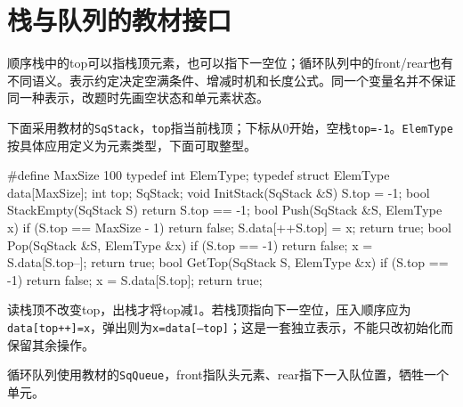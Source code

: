\section{栈与队列的教材接口}\label{DS03-code}

\begin{definition}

顺序栈中的top可以指栈顶元素，也可以指下一空位；循环队列中的front/rear也有不同语义。表示约定决定空满条件、增减时机和长度公式。同一个变量名并不保证同一种表示，改题时先画空状态和单元素状态。

\end{definition}

下面采用教材的\texttt{SqStack}，\texttt{top}指当前栈顶；下标从0开始，空栈\texttt{top=\allowbreak{}-1}。\texttt{ElemType}按具体应用定义为元素类型，下面可取整型。

\par\medskip\noindent\begin{minipage}{\linewidth}
\begin{codeblock}[language=C++]
#define MaxSize 100
typedef int ElemType;
typedef struct {
    ElemType data[MaxSize];
    int top;
} SqStack;
void InitStack(SqStack &S) { S.top = -1; }
bool StackEmpty(SqStack S) { return S.top == -1; }
bool Push(SqStack &S, ElemType x) {
    if (S.top == MaxSize - 1) return false;
    S.data[++S.top] = x;
    return true;
}
bool Pop(SqStack &S, ElemType &x) {
    if (S.top == -1) return false;
    x = S.data[S.top--];
    return true;
}
bool GetTop(SqStack S, ElemType &x) {
    if (S.top == -1) return false;
    x = S.data[S.top];
    return true;
}
\end{codeblock}
\end{minipage}\par\medskip

读栈顶不改变top，出栈才将top减1。若栈顶指向下一空位，压入顺序应为\texttt{data[\allowbreak{}top+\allowbreak{}+\allowbreak{}]\allowbreak{}=\allowbreak{}x}，弹出则为\texttt{x=\allowbreak{}data[\allowbreak{}--top]\allowbreak{}}；这是一套独立表示，不能只改初始化而保留其余操作。

循环队列使用教材的\texttt{SqQueue}，front指队头元素、rear指下一入队位置，牺牲一个单元。


